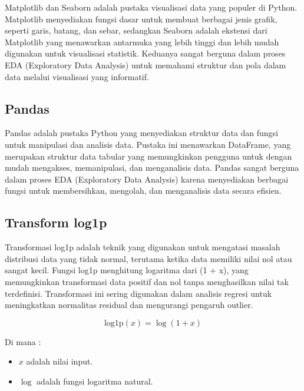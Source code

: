 Matplotlib dan Seaborn adalah pustaka visualisasi data yang populer di Python. Matplotlib menyediakan fungsi dasar untuk membuat berbagai jenis grafik, seperti garis, batang, dan sebar, sedangkan Seaborn adalah ekstensi dari Matplotlib yang menawarkan antarmuka yang lebih tinggi dan lebih mudah digunakan untuk visualisasi statistik. Keduanya sangat berguna dalam proses EDA (Exploratory Data Analysis) untuk memahami struktur dan pola dalam data melalui visualisasi yang informatif.

\subsection{Pandas}

Pandas adalah pustaka Python yang menyediakan struktur data dan fungsi untuk manipulasi dan analisis data. Pustaka ini menawarkan DataFrame, yang merupakan struktur data tabular yang memungkinkan pengguna untuk dengan mudah mengakses, memanipulasi, dan menganalisis data. Pandas sangat berguna dalam proses EDA (Exploratory Data Analysis) karena menyediakan berbagai fungsi untuk membersihkan, mengolah, dan menganalisis data secara efisien.

\subsection{Transform log1p}
Transformasi log1p adalah teknik yang digunakan untuk mengatasi masalah distribusi data yang tidak normal, terutama ketika data memiliki nilai nol atau sangat kecil. Fungsi log1p menghitung logaritma dari (1 + x), yang memungkinkan transformasi data positif dan nol tanpa menghasilkan nilai tak terdefinisi. Transformasi ini sering digunakan dalam analisis regresi untuk meningkatkan normalitas residual dan mengurangi pengaruh outlier.

\begin{equation}
    \text{log1p}(x) = \log(1 + x)
\end{equation}

Di mana :
\begin{itemize}
    \item $x$ adalah nilai input.
    \item $\log$ adalah fungsi logaritma natural.
\end{itemize}

